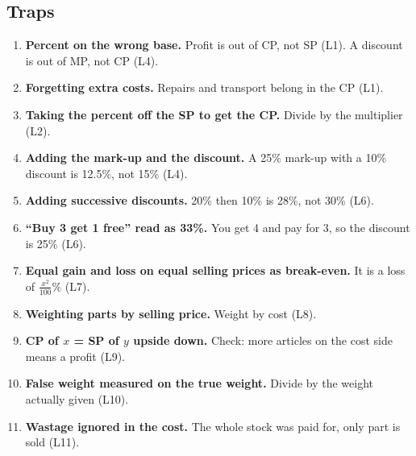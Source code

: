 \documentclass[11pt,a4paper]{article}
\let\oldsubsection\subsection
\renewcommand{\subsection}{\needspace{9\baselineskip}\oldsubsection}
\begin{document}
\subsection*{Traps}
\begin{enumerate}
\item \textbf{Percent on the wrong base.} Profit is out of CP, not SP (L1). A discount is out of MP, not CP (L4).
\item \textbf{Forgetting extra costs.} Repairs and transport belong in the CP (L1).
\item \textbf{Taking the percent off the SP to get the CP.} Divide by the multiplier (L2).
\item \textbf{Adding the mark-up and the discount.} A 25\% mark-up with a 10\% discount is 12.5\%, not 15\% (L4).
\item \textbf{Adding successive discounts.} 20\% then 10\% is 28\%, not 30\% (L6).
\item \textbf{``Buy 3 get 1 free'' read as 33\%.} You get 4 and pay for 3, so the discount is 25\% (L6).
\item \textbf{Equal gain and loss on equal selling prices as break-even.} It is a loss of $\frac{x^2}{100}\%$ (L7).
\item \textbf{Weighting parts by selling price.} Weight by cost (L8).
\item \textbf{CP of $x$ = SP of $y$ upside down.} Check: more articles on the cost side means a profit (L9).
\item \textbf{False weight measured on the true weight.} Divide by the weight actually given (L10).
\item \textbf{Wastage ignored in the cost.} The whole stock was paid for, only part is sold (L11).
\end{enumerate}
\end{document}

